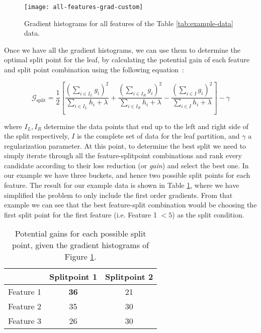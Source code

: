 \begin{figure}
	\centering
	\texttt{[image: all-features-grad-custom]}
	\caption{Gradient histograms for all features of the Table \ref{tab:example-data} data.
		}
	\label{fig:gradient-all-features}
\end{figure}

Once we have all the gradient histograms, we can use them to determine the optimal split point for the
leaf, by calculating the potential gain of each feature and split point combination using the following equation~\cite{xgboost}:

\begin{equation}
	\mathcal{G}_{\text{split}} = \frac{1}{2} \left[\frac{\left(\sum_{i \in I_{L}} g_{i} \right)^{2}} {\sum_{i \in I_{L}} h_{i}+ \lambda} + \frac{\left(\sum_{i \in I_{R}} g_{i} \right)^{2}}{\sum_{i \in I_{R}} h_{i} + \lambda} - \frac{\left(\sum_{i \in I}g_{i}\right)^{2}}{\sum_{i \in I}h_{i}+\lambda}\right]-\gamma
\end{equation}

\noindent
where $I_L, I_R$ determine the data points that end up to the left and right side of the split
respectively, $I$ is the complete set of data for the leaf partition, and $\gamma$ a
regularization parameter. At this point, to determine
the best split we need to simply iterate through all the feature-splitpoint combinations
and rank every candidate according to their loss reduction (or \textit{gain}) and select the
best one. In our example we have three buckets, and hence two possible split points for each feature. The result for our example data is shown in Table \ref{tab:gains}, where
we have simplified the problem to only include the first order gradients. From that example
we can see that the best feature-split combination would be choosing the first split
point for the first feature (i.e. Feature 1 $< 5$) as the split condition.

\begin{table}
	\centering
	\begin{tabular}{ccc}
		\toprule
		& Splitpoint 1 & Splitpoint 2 \\
		\midrule
		Feature 1 & \textbf{36} & 21 \\
		Feature 2 & 35 & 30 \\
		Feature 3 & 26 & 30 \\
		\bottomrule
	\end{tabular}
	\caption{Potential gains for each possible split point, given
	the gradient histograms of Figure \ref{fig:gradient-all-features}.}
	\label{tab:gains}
\end{table}

